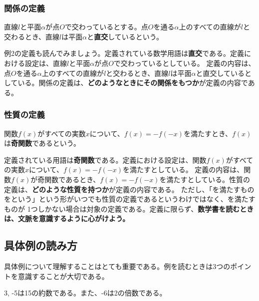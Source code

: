 \documentclass{jlreq}
\begin{document}
\subsubsection{関係の定義}
\begin{tcolorbox}[enhanced,title=例2, 
  attach boxed title to top left, 
  colback=white!95!blue,
  colbacktitle=white!10!blue!50!black,
  drop fuzzy shadow,
  boxrule=0.25mm,
  ]
  直線$l$と平面$\alpha$が点$O$で交わっているとする。点$O$を通る$\alpha$上のすべての直線が$l$と交わるとき、直線$l$は平面$\alpha$と\textbf{直交}しているという。
\end{tcolorbox}

例2の定義も読んでみましょう。定義されている数学用語は\textbf{直交}である。定義における設定は、直線$l$と平面$\alpha$が点$O$で交わっているとしている。
定義の内容は、点$O$を通る$\alpha$上のすべての直線が$l$と交わるとき、直線$l$は平面$\alpha$と直交しているとしている。関係の定義は、\textbf{どのようなときにその関係をもつか}が定義の内容である。

\subsubsection{性質の定義}
\begin{tcolorbox}[enhanced,title=例3, 
  attach boxed title to top left, 
  colback=white!95!blue,
  colbacktitle=white!10!blue!50!black,
  drop fuzzy shadow,
  boxrule=0.25mm,
  ]
  関数$f(x)$がすべての実数$x$について、$f(x) = - f(-x)$を満たすとき、$f(x)$は\textbf{奇関数}であるという。
\end{tcolorbox}

定義されている用語は\textbf{奇関数}である。定義における設定は、関数$f(x)$がすべての実数$x$について、$f(x) = - f(-x)$を満たすとしている。
定義の内容は、関数$f(x)$が奇関数であるとき、$f(x) = - f(-x)$を満たすとしている。性質の定義は、\textbf{どのような性質を持つか}が定義の内容である。
ただし、「\triangle \triangle を満たすものを\star \star という」という形がいつでも性質の定義であるというわけではなく、\triangle \triangle を満たすものが
1つしかない場合は対象の定義である。定義に限らず、\textbf{数学書を読むときは、文脈を意識するように心がけよう。}

\subsection{具体例の読み方}
具体例について理解することはとても重要である。例を読むときは3つのポイントを意識することが大切である。
\begin{tcolorbox}[enhanced,title=例4, 
  attach boxed title to top left, 
  colback=white!95!blue,
  colbacktitle=white!10!blue!50!black,
  drop fuzzy shadow,
  boxrule=0.25mm,
  ]
  3, -5は15の約数である。また、-6は2の倍数である。
\end{tcolorbox}
\end{document}
